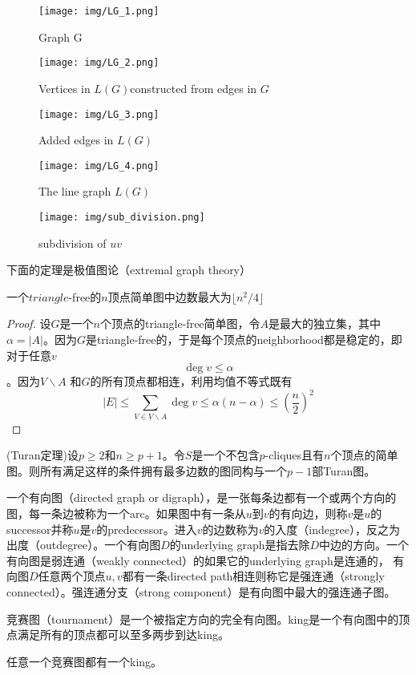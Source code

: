 \begin{figure*}[htb]
	\centering
\texttt{[image: img/LG\_1.png]}
	\caption{Graph G\label{fig:LG_1}}
\end{figure*}
\begin{figure*}[htb]
	\centering
\texttt{[image: img/LG\_2.png]}
	\caption{Vertices in $L(G) $constructed from edges in $G$\label{fig:LG_2}}
\end{figure*}
\begin{figure*}[htb]
	\centering
\texttt{[image: img/LG\_3.png]}
	\caption{Added edges in $L(G)$\label{fig:LG_3}}
\end{figure*}
\begin{figure*}[htb]
	\centering
\texttt{[image: img/LG\_4.png]}
	\caption{The line graph $L(G)$\label{fig:LG_4}}
\end{figure*}
\begin{figure*}[htb]
	\centering
\texttt{[image: img/sub\_division.png]}
	\caption{subdivision of $uv$\label{fig:subdivision}}
\end{figure*}
下面的定理是极值图论（extremal graph theory）
\begin{theorem}
	一个$triangle$-free的$n$顶点简单图中边数最大为$\lfloor n^2/4 \rfloor$
\end{theorem}
\begin{proof}
	设$G$是一个$n$个顶点的triangle-free简单图，令$A$是最大的独立集，其中$\alpha = |A|$。因为$G$是triangle-free的，于是每个顶点的neighborhood都是稳定的，即对于任意$v$
	\begin{equation*}
		\deg v \leq \alpha
	\end{equation*}
	。因为$V\backslash A$ 和$G$的所有顶点都相连，利用均值不等式既有
	\begin{equation*}
		|E| \leq \sum\limits_{V\in V\backslash A}\deg v\leq \alpha (n-\alpha) \leq (\frac{n}{2})^2
	\end{equation*}
\end{proof}
\begin{theorem}
	(Turan定理)设$p\geq 2$和$n\geq p+1$。令$S$是一个不包含$p$-cliques且有$n$个顶点的简单图。则所有满足这样的条件拥有最多边数的图同构与一个$p-1$部Turan图。
\end{theorem}
\begin{definition}
	一个有向图（directed graph or digraph），是一张每条边都有一个或两个方向的图，每一条边被称为一个arc。如果图中有一条从$u$到$v$的有向边，则称$v$是$u$的successor并称$u$是$v$的predecessor。进入$v$的边数称为$v$的入度（indegree），反之为出度（outdegree）。一个有向图$D$的underlying graph是指去除$D$中边的方向。一个有向图是弱连通（weakly connected）的如果它的underlying graph是连通的， 有向图$D$任意两个顶点$u,v$都有一条directed path相连则称它是强连通（strongly connected）。强连通分支（strong component）是有向图中最大的强连通子图。
\end{definition}
\begin{definition}
	竞赛图（tournament）是一个被指定方向的完全有向图。king是一个有向图中的顶点满足所有的顶点都可以至多两步到达king。
\end{definition}
\begin{proposition}
	任意一个竞赛图都有一个king。
\end{proposition}
